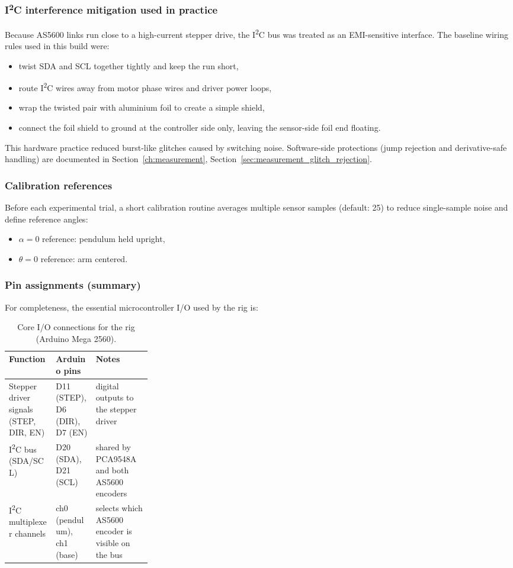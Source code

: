 \subsubsection*{I\textsuperscript{2}C interference mitigation used in practice}
Because AS5600 links run close to a high-current stepper drive, the I\textsuperscript{2}C bus was treated as an EMI-sensitive interface. The baseline wiring rules used in this build were:
\begin{itemize}
  \item twist SDA and SCL together tightly and keep the run short,
  \item route I\textsuperscript{2}C wires away from motor phase wires and driver power loops,
  \item wrap the twisted pair with aluminium foil to create a simple shield,
  \item connect the foil shield to ground at the controller side only, leaving the sensor-side foil end floating.
\end{itemize}
This hardware practice reduced burst-like glitches caused by switching noise. Software-side protections (jump rejection and derivative-safe handling) are documented in Section~\ref{ch:measurement}, Section~\ref{sec:measurement_glitch_rejection}.

\subsubsection*{Calibration references}
Before each experimental trial, a short calibration routine averages multiple sensor samples (default: 25) to reduce single-sample noise and define reference angles:
\begin{itemize}
  \item $\alpha=0$ reference: pendulum held upright,
  \item $\theta=0$ reference: arm centered.
\end{itemize}

\subsubsection*{Pin assignments (summary)}
For completeness, the essential microcontroller I/O used by the rig is:
\begin{table}[htbp]
  \centering
  \small
  \setlength{\tabcolsep}{6pt}
  \caption{Core I/O connections for the rig (Arduino Mega 2560).}
  \label{tab:pin_map}
  \begin{tabularx}{\linewidth}{@{}l p{0.28\linewidth} X@{}}
    \toprule
    Function & Arduino pins & Notes \\
    \midrule
    Stepper driver signals (STEP, DIR, EN) & D11 (STEP), D6 (DIR), D7 (EN) & digital outputs to the stepper driver \\
    I\textsuperscript{2}C bus (SDA/SCL) & D20 (SDA), D21 (SCL) & shared by PCA9548A and both AS5600 encoders \\
    I\textsuperscript{2}C multiplexer channels & ch0 (pendulum), ch1 (base) & selects which AS5600 encoder is visible on the bus \\
    \bottomrule
  \end{tabularx}
\end{table}

